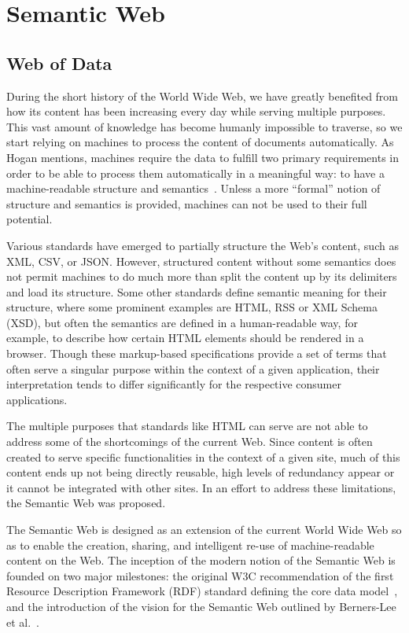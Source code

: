 \section{Semantic Web}

\subsection{Web of Data}
During the short history of the World Wide Web, we have greatly benefited from how its 
content has been increasing every day while serving multiple purposes. This vast amount of 
knowledge has become humanly impossible to traverse, so we start relying on machines to 
process the content of documents automatically. As Hogan mentions, machines require the 
data to fulfill two primary requirements in order to be able to process them automatically 
in a meaningful way: to have a machine-readable structure and semantics~\cite{key:linked14-Hogan}. 
Unless a more “formal” notion of structure and semantics is provided, machines can not 
be used to their full potential.

Various standards have emerged to partially structure the Web’s content, such as XML, CSV, 
or JSON. However, structured content without some semantics does not permit machines to do 
much more than split the content up by its delimiters and load its structure. Some other 
standards define semantic meaning for their structure, where some prominent examples are 
HTML, RSS or XML Schema (XSD), but often the semantics are defined in a human-readable way, 
for example, to describe how certain HTML elements should be rendered in a browser. Though 
these markup-based specifications provide a set of terms that often serve a singular purpose 
within the context of a given application, their interpretation tends to differ significantly 
for the respective consumer applications. 

The multiple purposes that standards like HTML can serve are not able to address some of the 
shortcomings of the current Web. Since content is often created to serve specific functionalities 
in the context of a given site, much of this content ends up not being directly reusable, 
high levels of redundancy appear or it cannot be integrated with other sites. In an effort 
to address these limitations, the Semantic Web was proposed.

The Semantic Web is designed as an extension of the current World Wide Web so as to enable 
the creation, sharing, and intelligent re-use of machine-readable content on the Web. The 
inception of the modern notion of the Semantic Web is founded on two major milestones: the 
original W3C recommendation of the first Resource Description Framework (RDF) standard 
defining the core data model~\cite{key:oldrdf}, and the introduction of the vision for the 
Semantic Web outlined by Berners-Lee et al.~\cite{key:semwebsa}.

